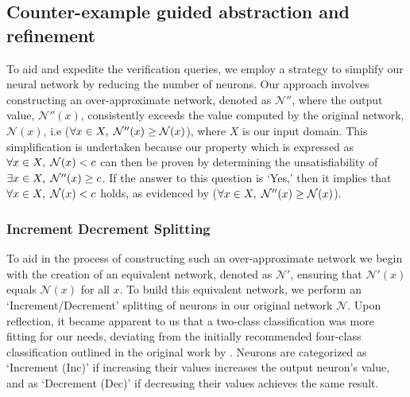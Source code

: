 \subsection{Counter-example guided abstraction and refinement}
To aid and expedite the verification queries, we employ a strategy to simplify 
our neural network by reducing the number of neurons. Our approach involves
 constructing an over-approximate network, denoted as $\mathcal{N''}$, where 
 the output value, $\mathcal{N''}(x)$, consistently exceeds the value computed 
 by the original network, $\mathcal{N}(x)$, i.e ($\forall x \in X, \hspace{1mm} 
 \mathcal{N''}(x) \geq \mathcal{N}(x)$), where $X$ is our input domain. This
  simplification is undertaken because our property which is expressed as
   $\forall x \in X, \hspace{1mm} \mathcal{N}(x) < c$ can then be proven by 
   determining the unsatisfiability of $\exists x \in X, \hspace{1mm}\mathcal{N''}(x)
 \geq c$. If the answer to this question is `Yes,' then it implies that
  $\forall x \in X, \hspace{1mm} \mathcal{N}(x) < c$ holds, as evidenced by 
  ($\forall x \in X, \hspace{1mm} \mathcal{N''}(x) \geq \mathcal{N}(x)$).



\subsubsection{Increment Decrement Splitting}
To aid in the process of constructing such an over-approximate network 
we begin with the creation of an equivalent network, denoted as $\mathcal{N}'$,
 ensuring that $\mathcal{N'}(x)$ equals $\mathcal{N}(x)$ for all $x$.
To build this equivalent network, we perform an `Increment/Decrement'
splitting of neurons in our original network $\mathcal{N}$. Upon reflection, 
it became apparent to us that a two-class classification was more fitting for 
our needs, deviating from the initially recommended four-class classification 
outlined in the original work by \cite{b2}. Neurons are categorized as 
`Increment (Inc)' if increasing their values increases the output neuron's value,
 and as `Decrement (Dec)' if decreasing their values achieves the same result.

